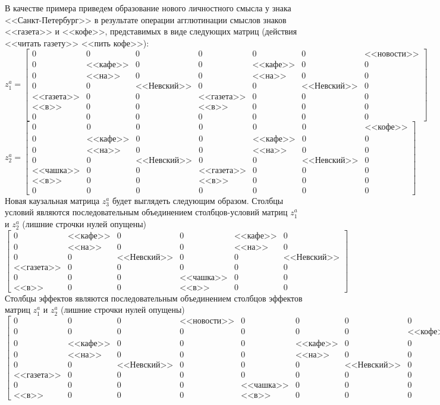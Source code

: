 \documentclass[12pt]{scrartcl}
\begin{document}
	В качестве примера приведем образование нового личностного смысла у знака <<Санкт-Петербург>> в результате операции агглютинации смыслов знаков <<газета>> и <<кофе>>, представимых в виде следующих матриц (действия <<читать газету>> <<пить кофе>>):
	\[
	z_1^a= \left[\begin{array}{ccc|cccc}
	0&0&0&0&0&0&\text{<<новости>>}\\
	0&\text{<<кафе>>}&0&0&\text{<<кафе>>}&0&0\\
	0&\text{<<на>>}&0&0 &\text{<<на>>}&0&0\\
	0& 0& \text{<<Невский>>}&0 &0&\text{<<Невский>>}&0\\
	\text{<<газета>>}&0&0&\text{<<газета>>}&0&0&0\\
	\text{<<в>>} &0 &0 &\text{<<в>>}&0&0&0\\
	0&0 &0 & 0 &0&0&0
	\end{array}
	\right]
	\]
	\[
	z_2^a= \left[\begin{array}{ccc|cccc}
	0&0&0&0&0&0&\text{<<кофе>>}\\
	0&\text{<<кафе>>}&0&0&\text{<<кафе>>}&0&0\\
	0&\text{<<на>>}&0&0 &\text{<<на>>}&0&0\\
	0& 0& \text{<<Невский>>}&0 &0&\text{<<Невский>>}&0\\
	\text{<<чашка>>}&0&0&\text{<<газета>>}&0&0&0\\
	\text{<<в>>} &0 &0 &\text{<<в>>}&0&0&0\\
	0&0 &0 & 0 &0&0&0
	\end{array}
	\right]
	\] 
	Новая каузальная матрица $z_3^a$ будет выглядеть следующим образом. Столбцы условий являются последовательным объединением столбцов-условий матриц $z_1^a$ и $z_2^a$ (лишние строчки нулей опущены)
	\[
	\left[\begin{array}{cccccc}
	0&\text{<<кафе>>}&0&0&\text{<<кафе>>}&0\\
	0&\text{<<на>>}&0&0 &\text{<<на>>}&0\\
	0& 0& \text{<<Невский>>}&0 &0&\text{<<Невский>>}\\
	\text{<<газета>>}&0&0&0&0&0\\
	0&0&0&\text{<<чашка>>}&0&0\\
	\text{<<в>>} &0 &0 &\text{<<в>>}&0&0
	\end{array}
	\right]
	\]
	Столбцы эффектов являются последовательным объединением столбцов эффектов матриц $z_1^a$ и $z_2^a$ (лишние строчки нулей опущены)
	\[
	\left[\begin{array}{cccccccc}
	0&0 &0 &\text{<<новости>>}&0&0&0&0\\
	0&0 &0 &0&0&0&0&\text{<<кофе>>}\\	
	0&\text{<<кафе>>}&0&0&0&\text{<<кафе>>}&0&0\\
	0&\text{<<на>>}&0&0&0 &\text{<<на>>}&0&0\\
	0& 0& \text{<<Невский>>}&0&0 &0&\text{<<Невский>>}&0\\
	\text{<<газета>>}&0&0&0&0&0&0&0\\
	0&0&0&0&\text{<<чашка>>}&0&0&0\\
	\text{<<в>>} &0 &0&0&\text{<<в>>}&0&0&0
	\end{array}
	\right]
	\]
	
\end{document}
